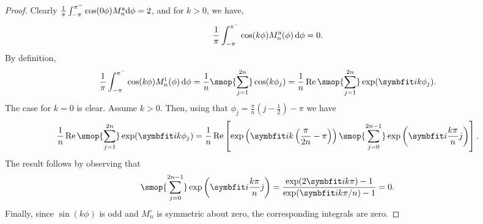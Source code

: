 
\begin{proof} 
    Clearly \( \frac{1}{\pi} \int_{-\pi}^{\pi^-} \cos(0 \phi) M_n^{\textup{a}} \textup{d}\phi = 2 \), and for \( k > 0 \), we have,
    \begin{equation*}
        \frac{1}{\pi} \int_{-\pi}^{\pi^-} \cos(k\phi) M_n^{\textup{a}}(\phi) \,\textup{d}\phi
        = 0.
    \end{equation*}
    By definition, 
    \begin{equation*}
        \frac{1}{\pi} \int_{-\pi}^{\pi^-} \cos(k\phi) M_n^{\textup{i}}(\phi) \,\d\phi
        = \frac{1}{n} \smop{\sum_{j=1}^{2n}} \cos(k \phi_j)
        = \frac{1}{n} \operatorname{Re} \smop{\sum_{j=1}^{2n}} \exp( \ii k \phi_j).
    \end{equation*}
    The case for \( k=0 \) is clear.
    Assume \( k > 0 \).
    Then, using that \( \phi_j = \frac{\pi}{n}(j-\frac{1}{2}) - \pi \) we have
    \begin{equation*}
        \frac{1}{n} \operatorname{Re} \smop{\sum_{j=1}^{2n}} \exp( \ii k \phi_j) 
        = \frac{1}{n} \operatorname{Re}\left[ \exp \left(\ii k\left(\frac{\pi}{2n}- \pi\right) \right) \smop{\sum_{j=0}^{2n-1}} \exp \left( \ii \frac{k\pi}{n} j \right) \right].
    \end{equation*}
    The result follows by observing that 
    \begin{equation*}
        \smop{\sum_{j=0}^{2n-1}} \exp\left( \ii \frac{k \pi}{n} j \right) 
        =  \frac{\exp(2\ii k \pi)-1}{\exp(\ii k \pi/n) - 1} 
        = 0.
    \end{equation*}
    Finally, since \( \sin(k\phi) \) is odd and \( M_n^\circ \) is symmetric about zero, the corresponding integrals are zero.
\end{proof}


